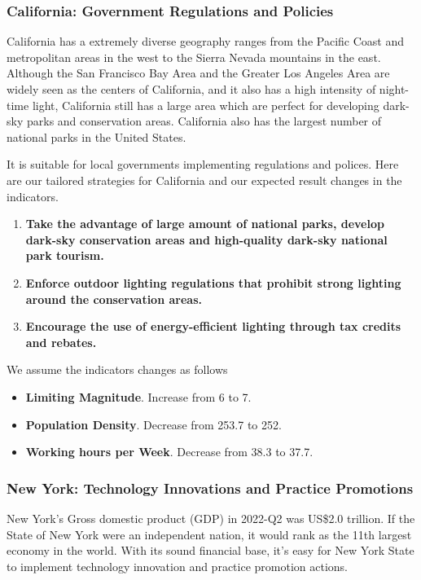 \subsubsection{California: Government Regulations and Policies}
California has a extremely diverse geography ranges from the Pacific Coast and metropolitan areas in the west to the Sierra Nevada mountains in the east. Although the San Francisco Bay Area and the Greater Los Angeles Area are widely seen as the centers of California, and it also has a high intensity of night-time light, California still has a large area which are perfect for developing dark-sky parks and conservation areas. California also has the largest number of national parks in the United States.

It is suitable for local governments implementing regulations and polices. Here are our tailored strategies for California and our expected result changes in the indicators.

\begin{enumerate}
    \item \textbf{Take the advantage of large amount of national parks, develop dark-sky conservation areas and high-quality dark-sky national park tourism.} 

    \item \textbf{Enforce outdoor lighting regulations that prohibit strong lighting around the conservation areas.}
    
    \item \textbf{Encourage the use of energy-efficient lighting through tax credits and rebates.}

\end{enumerate}

We assume the indicators changes as follows
\begin{itemize}
    \item \textbf{Limiting Magnitude}. Increase from 6 to 7.
    \item \textbf{Population Density}. Decrease from 253.7 to 252.
    \item \textbf{Working hours per Week}. Decrease from 38.3 to 37.7.
\end{itemize}

\subsubsection{New York: Technology Innovations and Practice Promotions}

New York's Gross domestic product (GDP) in 2022-Q2 was US\$2.0 trillion. If the State of New York were an independent nation, it would rank as the 11th largest economy in the world. With its sound financial base, it's easy for New York State to implement technology innovation and practice promotion actions.

